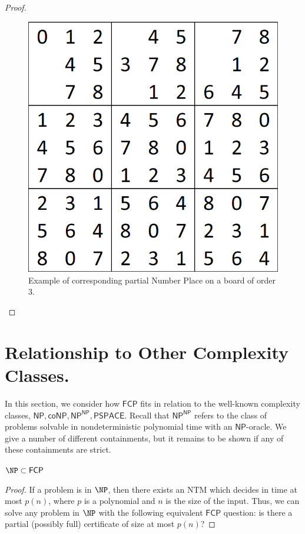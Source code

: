 \documentclass[runningheads,a4paper]{llncs}
\begin{document}
\begin{proof}
\begin{figure}[H]
\label{fig:partialNP}
\centering
\includegraphics[scale=0.25]{sudoku-1.png}
\caption{Example of corresponding partial Number Place on a board of order 3.}
\end{figure}

\end{proof}

\section{Relationship to Other Complexity Classes.}
\label{sec:relationship}

In this section, we consider how $\mathsf{FCP}$ fits in relation to the well-known complexity classes, $\mathsf{NP}, \mathsf{coNP}, \mathsf{NP}^\mathsf{NP}, \mathsf{PSPACE}$. Recall that $\mathsf{NP}^\mathsf{NP}$ refers to the class of problems solvable in nondeterministic polynomial time with an $\mathsf{NP}$-oracle. We give a number of different containments, but it remains to be shown if any of these containments are strict.

\begin{proposition}
$\NP \subset \mathsf{FCP}$
\end{proposition}

\begin{proof}
If a problem is in $\NP$, then there exists an NTM which decides in time at most $p(n)$, where $p$ is a polynomial and $n$ is the size of the input. Thus, we can solve any problem in $\NP$ with the following equivalent $\mathsf{FCP}$ question: is there a partial (possibly full) certificate of size at most $p(n)$?
\end{proof}
\end{document}
